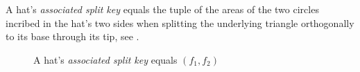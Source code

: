 \documentclass[a4paper,style=print,bibliography=totoc,nexus,lnum,extramargin]{tubsbook}
\begin{document}
\begin{definition}\label{def:hat-split-key}
    A hat's \emph{associated split key} equals the tuple of the areas of the two circles incribed in the hat's two sides when splitting the underlying triangle orthogonally to its base through its tip, see .
\end{definition}

\begin{figure}

    \caption{A hat's \emph{associated split key} equals $(f_1, f_2)$}
    \label{fig:hatf}
\end{figure}

\end{document}
